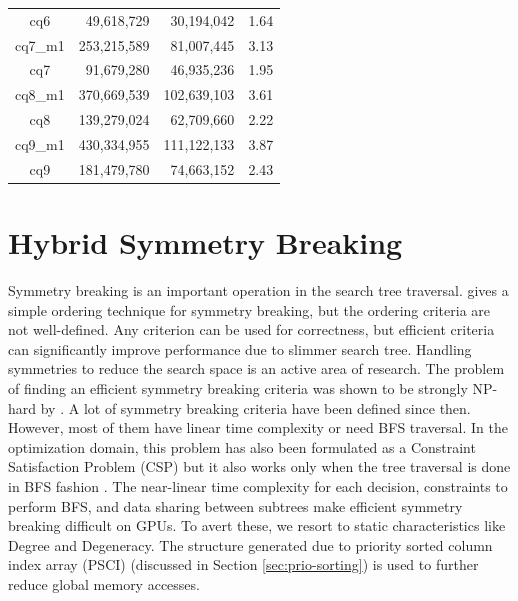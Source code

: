 \begin{table}[tbp]
\begin{tabular}{c|rrc}
        cq6                                                                    & 49,618,729                                                             & 30,194,042  & 1.64 \\
        cq7\_m1                                                                & 253,215,589                                                            & 81,007,445  & 3.13 \\
        cq7                                                                    & 91,679,280                                                             & 46,935,236  & 1.95 \\
        cq8\_m1                                                                & 370,669,539                                                            & 102,639,103 & 3.61 \\
        cq8                                                                    & 139,279,024                                                            & 62,709,660  & 2.22 \\
        cq9\_m1                                                                & 430,334,955                                                            & 111,122,133 & 3.87 \\
        cq9                                                                    & 181,479,780                                                            & 74,663,152  & 2.43 \\
    \end{tabular}%
    \label{tab:reuse-improvement}
\end{table}

\section{Hybrid Symmetry Breaking}\label{sec:hy-symbreak}
Symmetry breaking is an important operation in the search tree traversal.
\cite{ullman_sgm} gives a simple ordering technique for symmetry breaking, but the ordering criteria are not well-defined.
Any criterion can be used for correctness, but efficient criteria can significantly improve performance due to slimmer search tree.
Handling symmetries to reduce the search space is an active area of research.
The problem of finding an efficient symmetry breaking criteria was shown to be strongly NP-hard by \cite{crawford-sb-np-hard}.
A lot of symmetry breaking criteria have been defined since then.
However, most of them have linear time complexity or need BFS traversal.
In the optimization domain, this problem has also been formulated as a Constraint Satisfaction Problem (CSP) but it also works only when the tree traversal is done in BFS fashion \cite{sb-CSP}.
The near-linear time complexity for each decision, constraints to perform BFS, and data sharing between subtrees make efficient symmetry breaking difficult on GPUs.
To avert these, we resort to static characteristics like Degree and Degeneracy.
The structure generated due to priority sorted column index array (PSCI) (discussed in Section \ref{sec:prio-sorting}) is used to further reduce global memory accesses.

